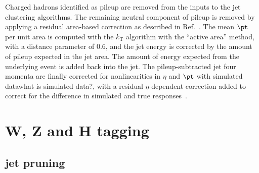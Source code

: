 Charged hadrons identified as pileup are removed from the inputs to
the jet clustering algorithms.  The remaining neutral component of pileup
is removed by applying a residual area-based correction as
described in Ref.~\cite{jetarea_fastjet,jetarea_fastjet_pu}.  The mean
$\pt$ per unit area is computed with the $k_{\mathrm T}$ algorithm
with the ``active area'' method, with a distance parameter of 0.6, and
the jet energy is corrected by the amount of pileup expected in the
jet area. The amount of energy expected from the underlying event is
added back into the jet.  The pileup-subtracted jet four momenta are
finally corrected for nonlinearities in $\eta$ and $\pt$ with
simulated data{\color{red}what is simulated data?}, 
with a residual $\eta$-dependent correction added to
correct for the difference in simulated and true
responses~\cite{JME-JINST,Collaboration:2012dp}.

\section{W, Z and H tagging}

\subsection{jet pruning}

